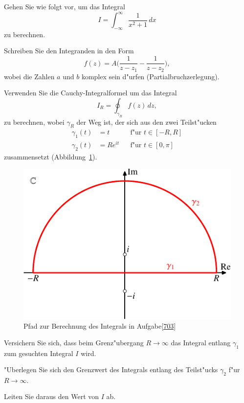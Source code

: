 \label{703}
Gehen Sie wie folgt vor, um das Integral
\[
I=\int_{-\infty}^{\infty} \frac1{x^2 + 1}\,dx
\]
zu berechnen.
\begin{teilaufgaben}
\item Schreiben Sie den Integranden in den Form
\begin{equation}
f(z)=A\biggl(\frac{1}{z-z_1} - \frac{1}{z-z_2}\biggr),
\label{702:fz}
\end{equation}
wobei die Zahlen $a$ und $b$ komplex sein d"urfen (Partialbruchzerlegung).
\item
Verwenden Sie die Cauchy-Integralformel um das Integral
\[
I_R
=
\oint_{\gamma_R}f(z)\,dz,
\]
zu berechnen,
wobei $\gamma_R$ der Weg ist, der sich aus den zwei Teilst"ucken
\[
\begin{aligned}
\gamma_1(t)&=t&&\text{f"ur $t\in[-R,R]$}\\
\gamma_2(t)&=Re^{it}&&\text{f"ur $t\in[0,\pi]$}
\end{aligned}
\]
zusammensetzt (Abbildung~\ref{703:path}).
\begin{figure}
\centering
\includegraphics{../skript/uebungsaufgaben/path-1.pdf}
\caption{Pfad zur Berechnung des Integrals in Aufgabe\ref{703}
\label{703:path}}
\end{figure}
\item 
Versichern Sie sich, dass beim Grenz"ubergang $R\to\infty$ das Integral
entlang $\gamma_1$ zum gesuchten Integral $I$ wird.
\item
"Uberlegen Sie sich den Grenzwert des Integrals entlang des Teilst"ucks
$\gamma_2$ f"ur $R\to\infty$.
\item
Leiten Sie daraus den Wert von $I$ ab.
\end{teilaufgaben}

